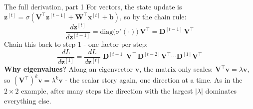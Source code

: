 \documentclass[aspectratio=169]{beamer}
\begin{document}
\begin{frame}{The full derivation, part 1}
  For vectors, the state update is
  $\mathbf{z}^{[t]} = \sigma(\mathbf{V}^\top\mathbf{z}^{[t-1]}+\mathbf{W}^\top\mathbf{x}^{[t]}+\mathbf{b})$,
  so by the chain rule:
  \[
    \frac{d\mathbf{z}^{[t]}}{d\mathbf{z}^{[t-1]}}
      = \text{diag}\big(\sigma'(\cdot)\big)\,\mathbf{V}^\top
      = \mathbf{D}^{[t-1]}\,\mathbf{V}^\top
  \]
  Chain this back to step $1$ - one factor per step:
  \[
    \frac{dL}{d\mathbf{z}^{[1]}} = \frac{dL}{d\mathbf{z}^{[t]}}\;
      \mathbf{D}^{[t-1]}\mathbf{V}^\top\,\mathbf{D}^{[t-2]}\mathbf{V}^\top\cdots
      \mathbf{D}^{[1]}\mathbf{V}^\top
  \]
  \vskip 8pt
  \vskip 6pt
  {\small \textbf{Why eigenvalues?} Along an eigenvector $\mathbf{v}$, the matrix only
  scales: $\mathbf{V}^\top\mathbf{v} = \lambda\mathbf{v}$, so
  $(\mathbf{V}^\top)^{k}\mathbf{v} = \lambda^{k}\mathbf{v}$ - the scalar story again, one
  direction at a time. As in the $2\times 2$ example, after many steps the direction with
  the largest $|\lambda|$ dominates everything else.}
\end{frame}
\end{document}
